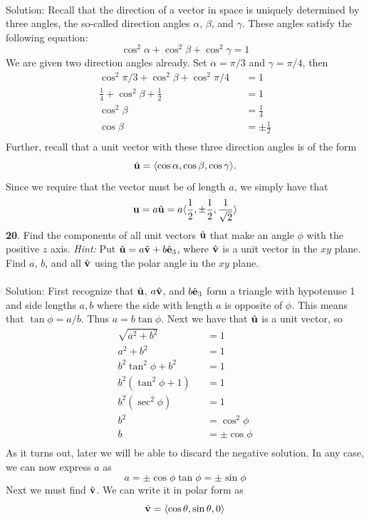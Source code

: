\documentclass[12pt]{amsbook}
\newcommand{\la}{\langle}
\newcommand{\ra}{\rangle}
\begin{document}
\\
{\sc Solution}:
Recall that the direction of a vector in space is uniquely determined by three angles, the so-called direction angles $\alpha$, $\beta$, and $\gamma$. These angles satisfy the following equation:
$$\cos^2\alpha+\cos^2\beta+\cos^2\gamma=1$$
We are given two direction angles already. Set $\alpha=\pi/3$ and $\gamma=\pi/4$, then
\begin{eqnarray*}
\cos^2\pi/3+\cos^2\beta+\cos^2\pi/4&&=1\\
\frac{1}{4}+\cos^2\beta+\frac{1}{2}&&=1\\
\cos^2\beta&&=\frac{1}{4}\\
\cos\beta&&=\pm\frac{1}{2}\\
\end{eqnarray*}
Further, recall that a unit vector with these three direction angles is of the form
$$\hat{\bf u}=\la \cos\alpha,\cos\beta,\cos\gamma \ra.$$
Since we require that the vector must be of length $a$, we simply have that 
$${\bf u}=a\hat{\bf u}=a\la \frac{1}{2}, \pm \frac{1}{2}, \frac{1}{\sqrt{2}}\ra$$
{\small\bf 20}. Find the components of all unit vectors $\hat{\bf u}$
that make an angle $\phi$ with the positive $z$ axis. {\it
Hint:} Put $\hat{\bf u}=a\hat{\bf v}+b\hat{\bf e}_3$, where
$\hat{\bf v}$ is a unit vector in the $xy$ plane. Find $a$, $b$,
and all $\hat{\bf v}$ using the polar angle in the $xy$ plane.\\
\\
{\sc Solution}: First recognize that $\hat{\bf u}$, $a\hat{\bf v}$, and $b\hat{\bf e}_3$ form a triangle with hypotenuse 1 and side lengths $a,b$ where the side with length $a$ is opposite of $\phi$. This means that $\tan\phi=a/b$. Thus $a=b\tan\phi$. Next we have that $\hat{\bf u}$ is a unit vector, so
\begin{eqnarray*}
\sqrt{a^2+b^2}&&=1\\
a^2+b^2&&=1 \\
b^2\tan^2\phi+b^2&&=1\\
b^2(\tan^2\phi+1)&&=1\\
b^2(\sec^2\phi)&&=1\\
b^2&&=\cos^2\phi\\
b&&=\pm \cos\phi\\
\end{eqnarray*}
As it turns out, later we will be able to discard the negative solution. In any case, we can now express $a$ as 
$$a=\pm \cos\phi\tan\phi=\pm \sin\phi$$
Next we must find $\hat{\bf v}$. We can write it in polar form as 
$$\hat{\bf v}=\la \cos\theta, \sin\theta, 0 \ra$$
\end{document}
